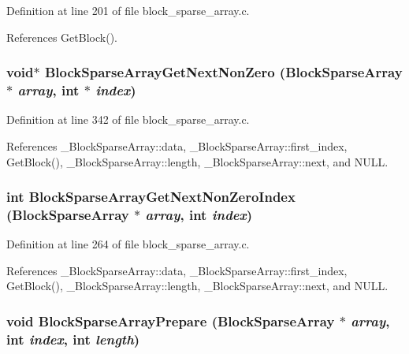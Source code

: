 Definition at line 201 of file block\_\-sparse\_\-array.c.

References Get\-Block().
\subsubsection{\setlength{\rightskip}{0pt plus 5cm}void$\ast$ Block\-Sparse\-Array\-Get\-Next\-Non\-Zero (\bf{Block\-Sparse\-Array} $\ast$ {\em array}, int $\ast$ {\em index})}\label{block__sparse__array_8h_2224a6eace237cc92f0c74744ab68247}




Definition at line 342 of file block\_\-sparse\_\-array.c.

References \_\-Block\-Sparse\-Array::data, \_\-Block\-Sparse\-Array::first\_\-index, Get\-Block(), \_\-Block\-Sparse\-Array::length, \_\-Block\-Sparse\-Array::next, and NULL.
\subsubsection{\setlength{\rightskip}{0pt plus 5cm}int Block\-Sparse\-Array\-Get\-Next\-Non\-Zero\-Index (\bf{Block\-Sparse\-Array} $\ast$ {\em array}, int {\em index})}\label{block__sparse__array_8h_2bc3cfe3a80e7f68cada4de4f38ab232}




Definition at line 264 of file block\_\-sparse\_\-array.c.

References \_\-Block\-Sparse\-Array::data, \_\-Block\-Sparse\-Array::first\_\-index, Get\-Block(), \_\-Block\-Sparse\-Array::length, \_\-Block\-Sparse\-Array::next, and NULL.
\subsubsection{\setlength{\rightskip}{0pt plus 5cm}void Block\-Sparse\-Array\-Prepare (\bf{Block\-Sparse\-Array} $\ast$ {\em array}, int {\em index}, int {\em length})}\label{block__sparse__array_8h_7f0e8079e206ab4caa1e80ee4418770d}




